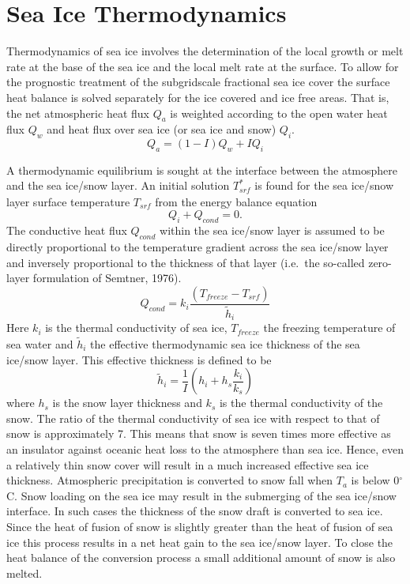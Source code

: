 \section{Sea Ice Thermodynamics}
\label{ch:ice:thermodynamics}

Thermodynamics of sea ice involves the determination
of the local growth or melt rate at the base of the sea ice and the local
melt rate at the surface. 
To allow for the prognostic treatment of the subgridscale fractional sea ice cover
the surface heat balance is solved separately for the ice covered and ice free areas.
That is,
the net atmospheric heat flux $Q_{a}$ is weighted according to the
open water heat flux $Q_{w}$ and heat
flux over sea ice (or sea ice and snow) $Q_{i}$.
\begin{equation}
\label{eqn:icethermo}
Q_{a} = (1 - I)Q_{w} + IQ_{i}
\end{equation}
 
A thermodynamic equilibrium is sought at the interface between
the atmosphere and the sea ice/snow layer.
An initial solution $T_{\mathit{srf}}^{\ast}$
is found for the sea ice/snow layer
surface temperature
$T_{\mathit{srf}}$
from the energy balance equation
\begin{equation}
\label{eqn:icesurf}
Q_i + Q_{\mathit{cond}} = 0.
\end{equation}
The conductive heat flux $Q_{\mathit{cond}}$ within the sea ice/snow layer is assumed to be
directly proportional to the temperature gradient across
the sea ice/snow layer and inversely proportional to the
thickness of that layer (i.e.\ the so-called zero-layer formulation of Semtner, 1976).\nocite{semtner76}
\begin{equation}
\label{cond1}
Q_{\mathit{cond}} = k_i \frac{(T_{\mathit{freeze}} - T_{\mathit{srf}})}{\tilde{h}_i}
\end{equation}
Here $k_i$ is the thermal conductivity of sea ice,
$T_{\mathit{freeze}}$ the freezing temperature of sea water
and $\tilde{h}_i$ the effective thermodynamic sea ice thickness of
the sea ice/snow layer.
This effective thickness is defined to be
\begin{equation}
\label{cond2}
\tilde{h}_i = \frac{1}{I}\left(h_i + h_s \frac{k_i}{k_s}\right)
\end{equation}
where $h_s$ is the snow layer thickness
and $k_s$ is the thermal conductivity of the snow.
The ratio of the thermal conductivity of sea ice with respect to
that of snow
is approximately 7.
This means that snow is seven times more effective as an insulator against
oceanic heat loss to the atmosphere than sea ice.
Hence, even a relatively thin snow cover will result
in a much increased effective sea ice thickness.
Atmospheric precipitation is converted to snow fall when
$T_{a}$ is below 0$^{\circ}$C\@.
Snow loading on the sea ice may result in the
submerging of the sea ice/snow interface.
In such cases the thickness of the snow draft is converted to sea ice.
Since the heat of fusion of snow is slightly greater than the heat of fusion
of sea ice this process results in a net heat gain to the sea ice/snow layer.
To close the heat balance of the conversion process a small additional
amount of snow is also melted.

